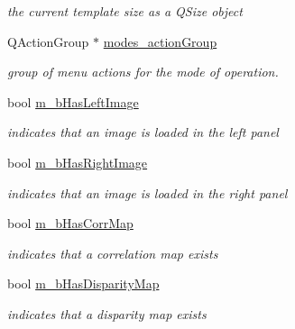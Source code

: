 \begin{CompactItemize}
\begin{CompactList}\small\item\em the current template size as a QSize object \item\end{CompactList}\item 
\hypertarget{classQcorr_3a964df80562c062d5f1f4f6cbf841bb}{
QActionGroup $\ast$ \hyperlink{classQcorr_3a964df80562c062d5f1f4f6cbf841bb}{modes\_\-actionGroup}}
\label{classQcorr_3a964df80562c062d5f1f4f6cbf841bb}

\begin{CompactList}\small\item\em group of menu actions for the mode of operation. \item\end{CompactList}\item 
\hypertarget{classQcorr_b5325b11a64e24eeb6b9bdc27a77d0ad}{
bool \hyperlink{classQcorr_b5325b11a64e24eeb6b9bdc27a77d0ad}{m\_\-bHasLeftImage}}
\label{classQcorr_b5325b11a64e24eeb6b9bdc27a77d0ad}

\begin{CompactList}\small\item\em indicates that an image is loaded in the left panel \item\end{CompactList}\item 
\hypertarget{classQcorr_a4afa1daa72ecf6caae74f6ced4ec251}{
bool \hyperlink{classQcorr_a4afa1daa72ecf6caae74f6ced4ec251}{m\_\-bHasRightImage}}
\label{classQcorr_a4afa1daa72ecf6caae74f6ced4ec251}

\begin{CompactList}\small\item\em indicates that an image is loaded in the right panel \item\end{CompactList}\item 
\hypertarget{classQcorr_40e40bfd5cc79d8abf6e7b41465f440e}{
bool \hyperlink{classQcorr_40e40bfd5cc79d8abf6e7b41465f440e}{m\_\-bHasCorrMap}}
\label{classQcorr_40e40bfd5cc79d8abf6e7b41465f440e}

\begin{CompactList}\small\item\em indicates that a correlation map exists \item\end{CompactList}\item 
\hypertarget{classQcorr_42ef5dadd6c1ff9f560de8cb1f43c2c6}{
bool \hyperlink{classQcorr_42ef5dadd6c1ff9f560de8cb1f43c2c6}{m\_\-bHasDisparityMap}}
\label{classQcorr_42ef5dadd6c1ff9f560de8cb1f43c2c6}

\begin{CompactList}\small\item\em indicates that a disparity map exists \item\end{CompactList}\end{CompactItemize}
